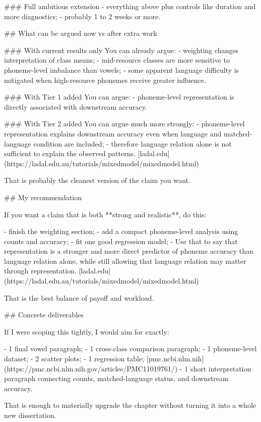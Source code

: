 ### Full ambitious extension
- everything above plus controls like duration and more diagnostics;
- probably 1 to 2 weeks or more.

## What can be argued now vs after extra work

### With current results only
You can already argue:
- weighting changes interpretation of class means;
- mid-resource classes are more sensitive to phoneme-level imbalance than vowels;
- some apparent language difficulty is mitigated when high-resource phonemes receive greater influence.

### With Tier 1 added
You can argue:
- phoneme-level representation is directly associated with downstream accuracy.

### With Tier 2 added
You can argue much more strongly:
- phoneme-level representation explains downstream accuracy even when language and matched-language condition are included;
- therefore language relation alone is not sufficient to explain the observed patterns. [ladal.edu](https://ladal.edu.au/tutorials/mixedmodel/mixedmodel.html)

That is probably the cleanest version of the claim you want.

## My recommendation

If you want a claim that is both **strong and realistic**, do this:

- finish the weighting section;
- add a compact phoneme-level analysis using counts and accuracy;
- fit one good regression model;
- Use that to say that representation is a stronger and more direct predictor of phoneme accuracy than language relation alone, while still allowing that language relation may matter through representation. [ladal.edu](https://ladal.edu.au/tutorials/mixedmodel/mixedmodel.html)

That is the best balance of payoff and workload.

## Concrete deliverables

If I were scoping this tightly, I would aim for exactly:

- 1 final vowel paragraph;
- 1 cross-class comparison paragraph;
- 1 phoneme-level dataset;
- 2 scatter plots;
- 1 regression table; [pmc.ncbi.nlm.nih](https://pmc.ncbi.nlm.nih.gov/articles/PMC11019761/)
- 1 short interpretation paragraph connecting counts, matched-language status, and downstream accuracy.

That is enough to materially upgrade the chapter without turning it into a whole new dissertation.
\fi




